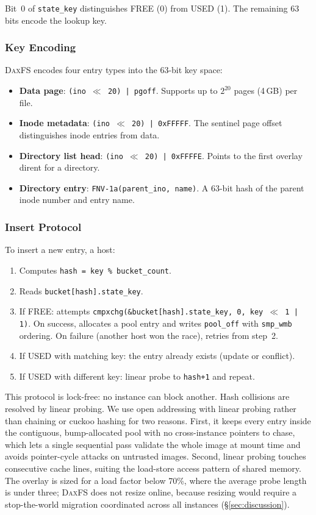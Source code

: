 \documentclass[letterpaper,twocolumn,10pt]{article}
\newcommand{\daxfs}{\textsc{DaxFS}\xspace}
\begin{document}
Bit~0 of \texttt{state\_key} distinguishes FREE (0) from USED (1).
The remaining 63 bits encode the lookup key.

\subsubsection{Key Encoding}

\daxfs encodes four entry types into the 63-bit key space:

\begin{itemize}
\item \textbf{Data page}: \texttt{(ino $\ll$ 20) | pgoff}.  Supports
  up to $2^{20}$ pages (4\,GB) per file.
\item \textbf{Inode metadata}: \texttt{(ino $\ll$ 20) | 0xFFFFF}.
  The sentinel page offset distinguishes inode entries from data.
\item \textbf{Directory list head}: \texttt{(ino $\ll$ 20) | 0xFFFFE}.
  Points to the first overlay dirent for a directory.
\item \textbf{Directory entry}: \texttt{FNV-1a(parent\_ino, name)}.
  A 63-bit hash of the parent inode number and entry name.
\end{itemize}

\subsubsection{Insert Protocol}

To insert a new entry, a host:
\begin{enumerate}
\item Computes \texttt{hash = key \% bucket\_count}.
\item Reads \texttt{bucket[hash].state\_key}.
\item If FREE: attempts \texttt{cmpxchg(\&bucket[hash].state\_key, 0,
  key $\ll$ 1 | 1)}.  On success, allocates a pool entry and writes
  \texttt{pool\_off} with \texttt{smp\_wmb} ordering.  On failure
  (another host won the race), retries from step~2.
\item If USED with matching key: the entry already exists (update or
  conflict).
\item If USED with different key: linear probe to \texttt{hash+1} and
  repeat.
\end{enumerate}

This protocol is lock-free: no instance can block another.  Hash
collisions are resolved by linear probing.  We use open addressing with
linear probing rather than chaining or cuckoo hashing for two reasons.
First, it keeps every entry inside the contiguous, bump-allocated pool
with no cross-instance pointers to chase, which lets a single
sequential pass validate the whole image at mount time and avoids
pointer-cycle attacks on untrusted images.  Second, linear probing
touches consecutive cache lines, suiting the load-store access pattern
of shared memory.  The overlay is sized for a load factor below 70\%,
where the average probe length is under three; \daxfs does not resize
online, because resizing would require a stop-the-world migration
coordinated across all instances (\S\ref{sec:discussion}).
\end{document}
